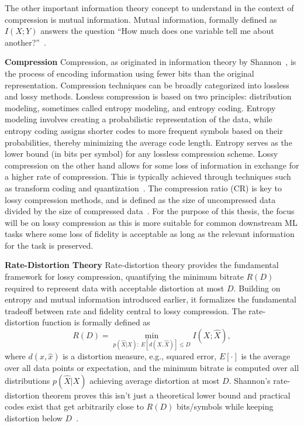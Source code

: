 The other important information theory concept to understand in the context of compression is mutual information. Mutual information, formally defined as $I(X;Y)$ answers the question ``How much does one variable tell me about another?''~\cite{Shannon1948}.

\textbf{Compression} Compression, as originated in information theory by Shannon~\cite{Shannon1948}, is the process of encoding information using fewer bits than the original representation. Compression techniques can be broadly categorized into lossless and lossy methods. Lossless compression is based on two principles: distribution modeling, sometimes called entropy modeling, and entropy coding. Entropy modeling involves creating a probabilistic representation of the data, while entropy coding assigns shorter codes to more frequent symbols based on their probabilities, thereby minimizing the average code length. Entropy serves as the lower bound (in bits per symbol) for any lossless compression scheme. Lossy compression on the other hand allows for some loss of information in exchange for a higher rate of compression. This is typically achieved through techniques such as transform coding and quantization~\cite{Sayood2017}. The compression ratio (CR) is key to lossy compression methods, and is defined as the size of uncompressed data divided by the size of compressed data~\cite{Thomasian2022}. For the purpose of this thesis, the focus will be on lossy compression as this is more suitable for common downstream ML tasks where some loss of fidelity is acceptable as long as the relevant information for the task is preserved.

\textbf{Rate-Distortion Theory} Rate-distortion theory provides the fundamental framework for lossy compression, quantifying the minimum bitrate $R(D)$ required to represent data with acceptable distortion at most $D$. Building on entropy and mutual information introduced earlier, it formalizes the fundamental tradeoff between rate and fidelity central to lossy compression. The rate-distortion function is formally defined as
\begin{equation}
R(D) = \min_{p(\hat{X}|X):\ E[d(X,\hat{X})] \leq D} I(X;\hat{X}),
\end{equation}
where $d(x,\hat{x})$ is a distortion measure, e.g., squared error, $E[\cdot]$ is the average over all data points or expectation, and the minimum bitrate is computed over all distributions $p(\hat{X}|X)$ achieving average distortion at most $D$. Shannon's rate-distortion theorem proves this isn't just a theoretical lower bound and practical codes exist that get arbitrarily close to $R(D)$ bits/symbols while keeping distortion below $D$~\cite{Shannon1949}.


